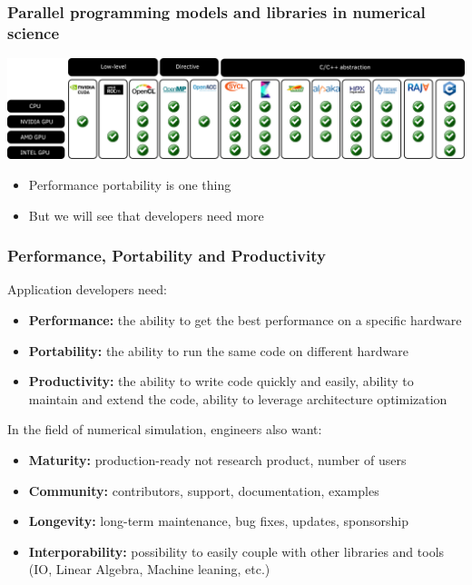 \documentclass[aspectratio=169]{beamer}
\begin{document}
\begin{frame}
    \frametitle{Parallel programming models and libraries in numerical science}

    \begin{center}
        \includegraphics[width=\textwidth]{../../images/prog_model.png}
    \end{center}

    \begin{itemize}
        \item Performance portability is one thing
        \item But we will see that developers need more
    \end{itemize}

\end{frame}


\begin{frame}
    \frametitle{Performance, Portability and Productivity}

Application developers need:

\begin{itemize}
    \item \textbf{Performance:} the ability to get the best performance on a specific hardware
    \item \textbf{Portability:} the ability to run the same code on different hardware
    \item \textbf{Productivity:} the ability to write code quickly and easily, ability to maintain and extend the code, ability to leverage architecture optimization
\end{itemize}

In the field of numerical simulation, engineers also want:

\begin{itemize}
    \item \textbf{Maturity:} production-ready not research product, number of users
    \item \textbf{Community:} contributors, support, documentation, examples
    \item \textbf{Longevity:} long-term maintenance, bug fixes, updates, sponsorship
    \item \textbf{Interporability:} possibility to easily couple with other libraries and tools (IO, Linear Algebra, Machine leaning, etc.)
\end{itemize}

\end{frame}
\end{document}
